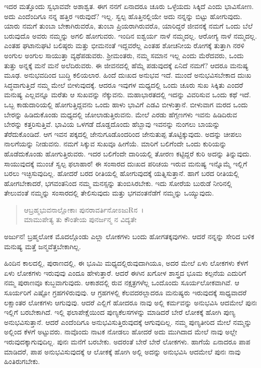 ಇದರ ಮತ್ತೊಂದು ಸ್ವಭಾವವೇ ಅಶಾಶ್ವತ. ಈಗ ನನಗೆ ಏನಾದರೂ ಚೂರು ಒಳ್ಳೆಯದು ಸಿಕ್ಕಿದೆ ಎಂದು ಭಾವಿಸೋಣ. ಅದು ಎಂದೆಂದಿಗೂ ನನ್ನ ಹತ್ತಿರ ಇರುವುದೆ? ಇಲ್ಲ. ಸ್ವಲ್ಪ ಹೊತ್ತಿನಲ್ಲಿಯೇ ಅದು ನನ್ನನ್ನು ಬಿಟ್ಟು ಹೋಗುವುದು. ಯಾರು ನಮಗೆ ತುಂಬಾ ಬೇಕಾಗಿರುವರೊ, ತುಂಬಾ ಪ್ರಿಯರಾಗಿರುವರೊ, ಯಾರಿದ್ದರೆ ಜೀವನಕ್ಕೆ ನಮಗೆ ಒಂದು ಬೆಲೆ ಬರುವುದೊ ಅವರು ನಮ್ಮನ್ನು ಅಗಲಿ ಹೋಗುವರು. ಇಂದಿನ ಐಶ್ವರ್ಯ ನಾಳೆ ನಮ್ಮದಲ್ಲ. ಆರೋಗ್ಯ ನಾಳೆ ನಮ್ಮದಲ್ಲ. ಎಂತಹ ಘಟಾನುಘಟಿ ಬಲಿಷ್ಠರು ಮತ್ತು ಭೀಮನಂತೆ ಇದ್ದವರೆಲ್ಲ ಎಂತಹ ಶೋಚನೀಯ ರೋಗಕ್ಕೆ ತುತ್ತಾಗಿ ನರಳಿ ಅಂಗುಲ ಅಂಗುಲ ಸಾಯುತ್ತಾ ವ್ಯಥೆಪಡುವರು. ಶ‍್ರೀಮಂತರು, ನಮ್ಮ ಸಮಾನ ಇಲ್ಲ ಎಂದು ಮೆರೆದವರು, ಒಂದು ತುತ್ತು ಅನ್ನಕ್ಕೆ ಮನೆ ಮನೆ ಅಲೆದಿರುವರು. ಈ ಜೀವನದಲ್ಲಿ ಹೆಮ್ಮೆ ಪಡುವುದಕ್ಕೆ ಏನಿದೆ ನಮಗೆ? ಆದರೂ ಮನುಷ್ಯ ಮೂಢ. ಅನುಭವದಿಂದ ಬುದ್ಧಿ ಕಲಿಯಲಾರ. ಹಿಂದೆ ದುಃಖದ ಅನುಭವ ಇದೆ. ಮುಂದೆ ಅನುಭವಿಸಬೇಕಾದ ದುಃಖ ಸಿದ್ಧವಾಗುತ್ತಿದೆ ನಮ್ಮ ಮೇಲೆ ಬೀಳುವುದಕ್ಕೆ. ಆದರೂ ಇವುಗಳ ಮಧ್ಯದಲ್ಲಿ ಒಂದು ಚೂರು ಸುಖ ಸಿಕ್ಕಿತು ಎಂದರೆ ಮನುಷ್ಯ ಎಲ್ಲವನ್ನೂ ಮರೆತು ಆ ಸುಖವನ್ನು ನೆಕ್ಕುವನು. ಮಹಾಭಾರತದಲ್ಲಿ ಇದನ್ನು ವಿವರಿಸುವ ಒಂದು ಕಥೆ ಇದೆ. ಒಬ್ಬ ಕಾಡುದಾರಿಯಲ್ಲಿ ಹೋಗುತ್ತಿದ್ದವನು ಒಂದು ಹಾಳು ಭಾವಿಗೆ ಎಡವಿ ಬೀಳುತ್ತಾನೆ. ಬೀಳುವಾಗ ಮರದ ಒಂದು ಬೇರನ್ನು ಹಿಡಿದುಕೊಂಡು ಮಧ್ಯದಲ್ಲಿ ಜೋಲಾಡುತ್ತಿರುವನು. ಮೇಲೆ ಎರಡು ಹೆಗ್ಗಣಗಳು ಇವನು ಹಿಡಿದಿರುವ ಬೇರನ್ನು ಕತ್ತರಿಸುತ್ತಿವೆ. ಭಾವಿಯ ಒಳಗಡೆ ದೊಡ್ಡದೊಂದು ಹೆಬ್ಬಾವು ಇವನನ್ನು ನುಂಗಲು ಬಾಯನ್ನು ತೆರೆದುಕೊಂಡಿದೆ. ಆಗ ಇವನ ಪಕ್ಕದಲ್ಲಿ ಜೇನುಗೂಡೊಂದರಿಂದ ಜೇನುತುಪ್ಪ ತೊಟ್ಟಿಕ್ಕುವುದು. ಅದನ್ನು ಚೀಪಲು ನಾಲಗೆಯನ್ನು ನೀಡುವನು. ನಮಗೆ ಸಿಕ್ಕುವ ಸುಖವೂ ಹೀಗೆಯೆ. ಮಾರಿಗೆ ಬಲಿಗೆಂದೇ ಒಂದು ಕುರಿಯನ್ನು ಹೊಡೆದುಕೊಂಡು ಹೋಗುತ್ತಿರುವರು. ಇದರ ಬಲಿಗೆಂದೇ ದಾರಿಯಲ್ಲಿ ತೋರಣ ಕಟ್ಟಿದ್ದರೆ ಕುರಿ ಅದನ್ನು ತಿನ್ನುವುದು. ಸಾಯುವುದಕ್ಕೆ ಮುಂಚೆ ಸ್ವಲ್ಪ ಫಲಾಹಾರ! ಈ ಸಂಸಾರದ ದುಃಖದ ಪರಿಚಯ ಇರುವ ಮನುಷ್ಯ ಇನ್ನೊಮ್ಮೆ ಇಲ್ಲಿಗೆ ಬರಲು ಇಚ್ಛಿಸುವುದಿಲ್ಲ. ಹೋದರೆ ಬರದ ರೀತಿಯಲ್ಲಿ ಹೋಗುವುದಕ್ಕೆ ಯತ್ನಿಸುತ್ತಾನೆ. ಹಾಗೆ ಬರದ ರೀತಿಯಲ್ಲಿ ಹೋಗಬೇಕಾದರೆ, ಭಗವಂತನಿಂದ ನಮ್ಮ ಮನಸ್ಸನ್ನು ತುಂಬಿಸಿರಬೇಕು. ಇದು ಸೋರೆಯ ಬುರುಡೆ ನೀರಿನಲ್ಲಿ ತೇಲುವಂತೆ ನಮ್ಮನ್ನು ಸಂಸಾರದಲ್ಲಿ ತೇಲಿಸುವುದು ಮತ್ತು ಭಗವಂತನೆಡೆಗೆ ನಮ್ಮನ್ನು ಒಯ್ಯುವುದು.

\begin{verse}
ಆಬ್ರಹ್ಮಭುವನಾಲ್ಲೋಕಾಃ ಪುನರಾವರ್ತಿನೋಽಜುRನ~।\\ಮಾಮುಪೇತ್ಯ ತು ಕೌಂತೇಯ ಪುನರ್ಜನ್ಮ ನ ವಿದ್ಯತೇ 
\end{verse}

{\small ಅರ್ಜುನ! ಬ್ರಹ್ಮಲೋಕ ಮೊದಲ್ಗೊಂಡು ಎಲ್ಲಾ ಲೋಕಗಳು ಬಂದು ಹೋಗತಕ್ಕವುಗಳು. ಆದರೆ ನನ್ನನ್ನು ಸೇರಿದ ಬಳಿಕ ಮನುಷ್ಯ ಮತ್ತೆ ಜನ್ಮವೆತ್ತಬೇಕಾಗಿಲ್ಲ.}

ಹಿಂದಿನ ಕಾಲದಲ್ಲಿ, ಪುರಾಣದಲ್ಲಿ, ಈ ಭೂಮಿ ಮಧ್ಯದಲ್ಲಿರುವುದಾಗಿಯೂ, ಅದರ ಮೇಲೆ ಏಳು ಲೋಕಗಳು ಕೆಳಗೆ ಏಳು ಲೋಕಗಳು ಇರುವುವು ಎಂದೂ ಹೇಳುತ್ತಾರೆ. ಆದರೆ ಈಗಿನ ಖಗೋಳ ಶಾಸ್ತ್ರದ ಭೂಮ ಕಲ್ಪನೆಯ ಎದುರಿಗೆ ನಮ್ಮ ಪುರಾಣವೂ ಕುಬ್ಜವಾಗುವುದು. ಆಕಾಶದಲ್ಲಿ ರುವ ನಕ್ಷತ್ರಗಳೆಲ್ಲ ಒಂದೊಂದು ಸೂರ್ಯಲೋಕವಾಗಿವೆ. ಆ ಸೂರ್ಯರಿಗೆ ಎಷ್ಟೋ ಗ್ರಹಗಳಿರುವುವು. ಆ ಗ್ರಹಗಳಲ್ಲಿ ಕೆಲವದರಲ್ಲಾದರೂ ಮನುಷ್ಯರು ಇರುವುದಕ್ಕೆ ಸಾಧ್ಯವಾದರೆ ಲಕ್ಷಾಂತರ ಲೋಕಗಳು ಆಗುವುವು. ಆದರೆ ಎಲ್ಲಿಗೆ ಹೋದರೂ ನಾವು ಅಲ್ಲಿ ಕರ್ಮವನ್ನು ಅನುಭವಿಸಿ ಆದಮೇಲೆ ಪುನಃ ಇಲ್ಲಿಗೆ ಬರಬೇಕಾಗಿದೆ. ಇಲ್ಲಿ ಫಲಾಪೇಕ್ಷೆಯಿಂದ ಪುಣ್ಯಕೆಲಸಗಳನ್ನು ಮಾಡಿದರೆ ಬೇರೆ ಲೋಕಕ್ಕೆ ಹೋಗಿ ಪುಣ್ಯ ಅನುಭವಿಸುತ್ತಾನೆ. ಆದರೆ ಎಂದೆಂದಿಗೂ ಅನುಭವಿಸುತ್ತಿರುವುದಕ್ಕೆ ಆಗುವುದಿಲ್ಲ. ನಮ್ಮ ಪುಣ್ಯತೀರಿದ ಮೇಲೆ ನಮ್ಮನ್ನು ಅಲ್ಲಿಂದ ಕೆಳಗೆ ಅಟ್ಟುವರು. ನಾವೊಂದು ನಾಟಕ ನೋಡಲು ಹೋದರೆ ಅದು ಮುಗಿದಾದ ಮೇಲೆ ನಾವು ಅಲ್ಲೇ ಇರುವುದಕ್ಕಾಗುವುದಿಲ್ಲ. ಪುನಃ ಮನೆಗೆ ಬರಬೇಕು. ಅದರಂತೆ ಬೇರೆ ಬೇರೆ ಲೋಕಗಳು. ಹಾಗೆಯೆ ಏನಾದರೂ ಪಾಪ ಮಾಡಿದರೆ, ಪಾಪ ಅನುಭವಿಸುವುದಕ್ಕೆ ಆ ಲೋಕಕ್ಕೆ ಹೋಗಿ ಅಲ್ಲಿ ಅದನ್ನು ಅನುಭವಿಸಿ ಆದಮೇಲೆ ಪುನಃ ನಾವು ಹಿಂತಿರುಗಬೇಕು.

